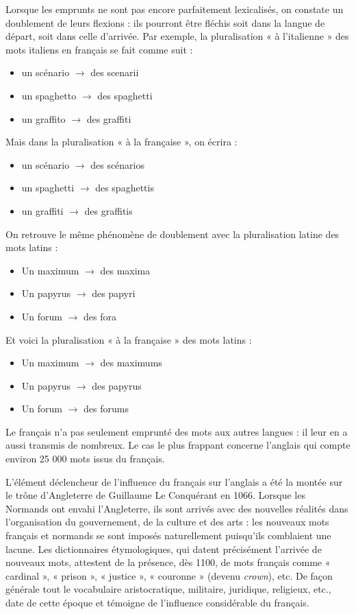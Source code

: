 Lorsque les emprunts ne sont pas encore parfaitement lexicalisés, on constate un doublement de leurs flexions : ils pourront être fléchis soit dans la langue de départ, soit dans celle d’arrivée. Par exemple, la pluralisation « à l’italienne » des mots italiens en français se fait comme suit :
\begin{itemize}
\item un scénario $\rightarrow$ des scenarii
\item un spaghetto $\rightarrow$ des spaghetti
\item un graffito $\rightarrow$ des graffiti
\end{itemize}
Mais dans la pluralisation « à la française », on écrira :
\begin{itemize}
\item un scénario $\rightarrow$ des scénarios
\item un spaghetti $\rightarrow$ des spaghettis
\item un graffiti $\rightarrow$ des graffitis
\end{itemize}
On retrouve le même phénomène de doublement avec la pluralisation latine des mots latins :
\begin{itemize}
\item Un maximum $\rightarrow$ des maxima
\item Un papyrus $\rightarrow$ des papyri
\item Un forum $\rightarrow$ des fora
\end{itemize}
Et voici la pluralisation « à la française » des mots latins :
\begin{itemize}
\item Un maximum $\rightarrow$ des maximums
\item Un papyrus $\rightarrow$ des papyrus
\item Un forum $\rightarrow$ des forums
\end{itemize}

Le français n’a pas seulement emprunté des mots aux autres langues : il leur en a aussi transmis de nombreux. Le cas le plus frappant concerne l’anglais qui compte environ 25 000 mots issus du français.

L’élément déclencheur de l’influence du français sur l’anglais a été la montée sur le trône d’Angleterre de Guillaume Le Conquérant en 1066. Lorsque les Normands ont envahi l’Angleterre, ils sont arrivés avec des nouvelles réalités dans l’organisation du gouvernement, de la culture et des arts : les nouveaux mots français et normands se sont imposés naturellement puisqu’ils comblaient une lacune. Les dictionnaires étymologiques, qui datent précisément l’arrivée de nouveaux mots, attestent de la présence, dès 1100, de mots français comme « cardinal », « prison », « justice », « couronne » (devenu \textit{crown}), etc. De façon générale tout le vocabulaire aristocratique, militaire, juridique, religieux, etc., date de cette époque et témoigne de l’influence considérable du français.

